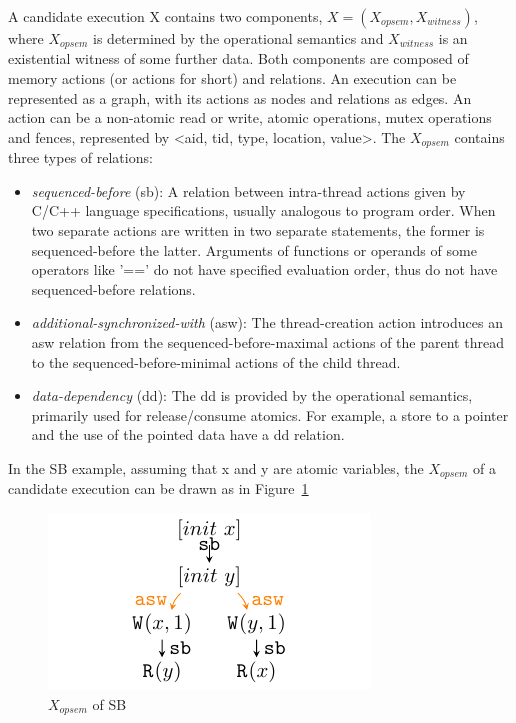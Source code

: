 A candidate execution X contains two components, $X = (X_{opsem}, X_{witness})$, where $X_{opsem}$ is determined by the operational semantics and $X_{witness}$ is an existential witness of some further data. Both components are composed of memory actions (or actions for short) and relations. An execution can be represented as a graph, with its actions as nodes and relations as edges. An action can be a non-atomic read or write, atomic operations, mutex operations and fences, represented by <aid, tid, type, location, value>. The $X_{opsem}$ contains three types of relations:

\begin{itemize}
	\item \textit{sequenced-before} (sb): A relation between intra-thread actions given by C/C++ language specifications, usually analogous to program order. When two separate actions are written in two separate statements, the former is sequenced-before the latter. Arguments of functions or operands of some operators like '==' do not have specified evaluation order, thus do not have sequenced-before relations.
	\item \textit{additional-synchronized-with} (asw): The thread-creation action introduces an asw relation from the sequenced-before-maximal actions of the parent thread to the sequenced-before-minimal actions of the child thread.
	\item \textit{data-dependency} (dd):  The dd is provided by the operational semantics, primarily used for release/consume atomics. For example, a store to a pointer and the use of the pointed data have a dd relation.
\end{itemize}

In the SB example,  assuming that x and y are atomic variables, the $X_{opsem}$ of a candidate execution can be drawn as in Figure~\ref{XopsemSB}

\begin{figure}[h!tbp] %
	\centering
	\includegraphics[scale=1]{figure/exec-graph/SB1.pdf} %
	\caption{$X_{opsem}$ of SB} %
	\label{XopsemSB} %
\end{figure}

